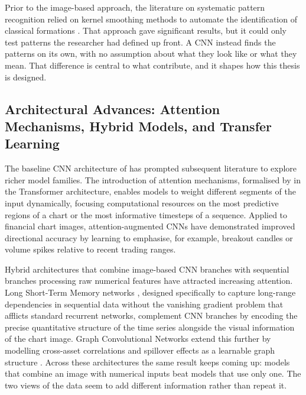 Prior to the image-based approach, the literature on systematic pattern recognition relied on kernel smoothing methods to automate the identification of classical formations \parencite{lo2000}. That approach gave significant results, but it could only test patterns the researcher had defined up front. A CNN instead finds the patterns on its own, with no assumption about what they look like or what they mean. That difference is central to what \textcite{Jiang2023} contribute, and it shapes how this thesis is designed.

\subsection{Architectural Advances: Attention Mechanisms, Hybrid Models, and Transfer Learning}

The baseline CNN architecture of \textcite{Jiang2023} has prompted subsequent literature to explore richer model families. The introduction of attention mechanisms, formalised by \textcite{vaswani2017} in the Transformer architecture, enables models to weight different segments of the input dynamically, focusing computational resources on the most predictive regions of a chart or the most informative timesteps of a sequence. Applied to financial chart images, attention-augmented CNNs have demonstrated improved directional accuracy by learning to emphasise, for example, breakout candles or volume spikes relative to recent trading ranges.

Hybrid architectures that combine image-based CNN branches with sequential branches processing raw numerical features have attracted increasing attention. Long Short-Term Memory networks \parencite{hochreiter1997}, designed specifically to capture long-range dependencies in sequential data without the vanishing gradient problem that afflicts standard recurrent networks, complement CNN branches by encoding the precise quantitative structure of the time series alongside the visual information of the chart image. Graph Convolutional Networks extend this further by modelling cross-asset correlations and spillover effects as a learnable graph structure \parencite{Chen2021Graph}. Across these architectures the same result keeps coming up: models that combine an image with numerical inputs beat models that use only one. The two views of the data seem to add different information rather than repeat it.

